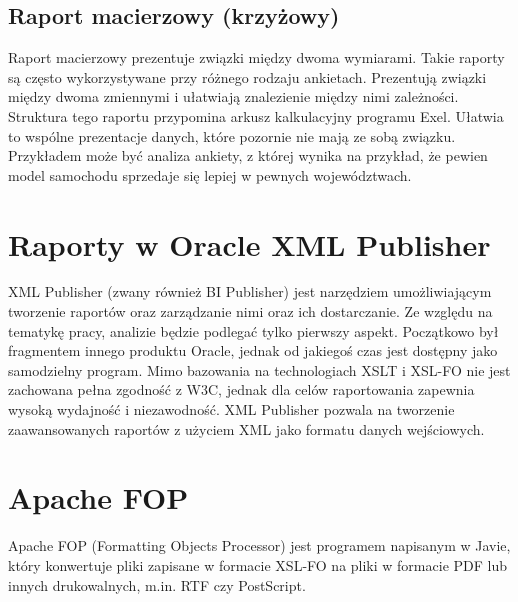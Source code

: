 \documentclass[11pt,a4paper]{article}
\begin{document}
\subsection{Raport macierzowy (krzyżowy)}\label{sec:macierzowy}
Raport macierzowy prezentuje związki między dwoma wymiarami. Takie raporty są często wykorzystywane przy różnego rodzaju ankietach. Prezentują związki między dwoma zmiennymi i ułatwiają znalezienie między nimi zależności. Struktura tego raportu przypomina arkusz kalkulacyjny programu Exel. Ułatwia to wspólne prezentacje danych, które pozornie nie mają ze sobą związku. Przykładem może być analiza ankiety, z której wynika na przykład, że pewien model samochodu sprzedaje się lepiej w pewnych województwach.
\section{Raporty w Oracle XML Publisher}\label{sec:raportOraclePublisher}
XML Publisher (zwany również BI Publisher) jest narzędziem umożliwiającym tworzenie raportów oraz zarządzanie nimi oraz ich dostarczanie. Ze względu na tematykę pracy, analizie będzie podlegać tylko pierwszy aspekt. Początkowo był fragmentem innego produktu Oracle, jednak od jakiegoś czas jest dostępny jako samodzielny program. Mimo bazowania na technologiach XSLT i XSL-FO nie jest zachowana pełna zgodność z W3C, jednak dla celów raportowania zapewnia wysoką wydajność i niezawodność. XML Publisher pozwala na tworzenie zaawansowanych raportów z użyciem XML jako formatu danych wejściowych. 

\section{Apache FOP}\label{sec:fop}
Apache FOP (Formatting Objects Processor) jest programem napisanym w Javie, który konwertuje pliki zapisane w formacie XSL-FO na pliki w formacie PDF lub innych drukowalnych, m.in. RTF czy PostScript. 
 
\end{document}
